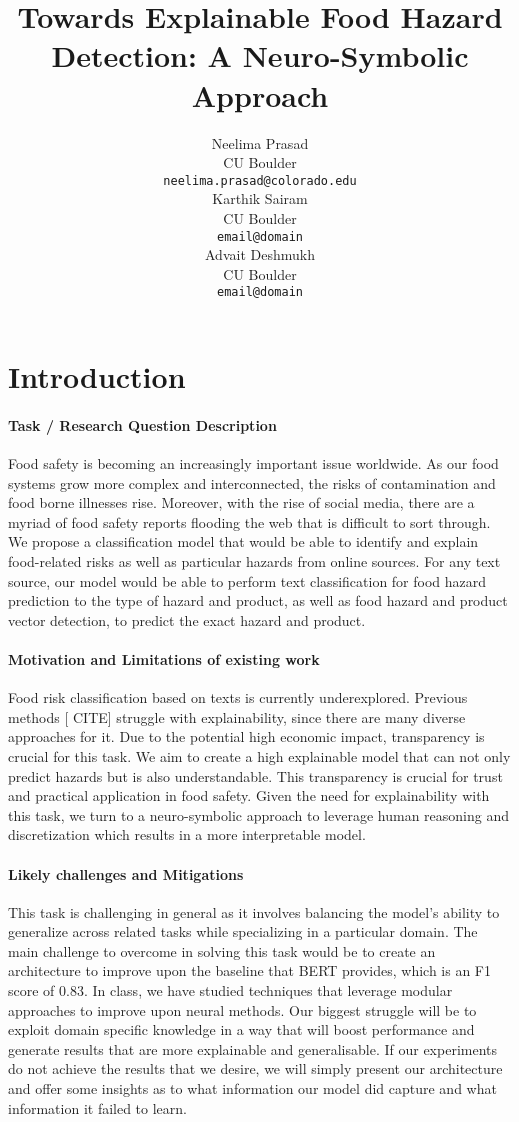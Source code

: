 \documentclass[11pt]{article}
\title{Towards Explainable Food Hazard Detection: A Neuro-Symbolic Approach}
\author{Neelima Prasad \\
  CU Boulder\\
  \texttt{neelima.prasad@colorado.edu} \\\And
  Karthik Sairam \\
  CU Boulder\\
  \texttt{email@domain} \\\And
  Advait Deshmukh \\
  CU Boulder\\
  \texttt{email@domain} \\}
\begin{document}
\maketitle


\section{Introduction}

\paragraph{Task / Research Question Description}
Food safety is becoming an increasingly important issue worldwide. As our food systems grow more complex and interconnected, the risks of contamination and food borne illnesses rise. Moreover, with the rise of social media, there are a myriad of food safety reports flooding the web that is difficult to sort through. We propose a classification model that would be able to identify and explain food-related risks as well as particular hazards from online sources. For any text source, our model would be able to perform text classification for food hazard prediction to the type of hazard and product, as well as food hazard and product vector detection, to predict the exact hazard and product.

\paragraph{Motivation and Limitations of existing work}
Food risk classification based on texts is currently underexplored. Previous methods [ CITE] struggle with explainability, since there are many diverse approaches for it. Due to the potential high economic impact, transparency is crucial for this task. We aim to create a high explainable model that can not only predict hazards but is also understandable. This transparency is crucial for trust and practical application in food safety. Given the need for explainability with this task, we turn to a neuro-symbolic approach to leverage human reasoning and discretization which results in a more interpretable model. 

\paragraph{Likely challenges and Mitigations}
This task is challenging in general as it involves balancing the model's ability to generalize across related tasks while specializing in a particular domain. The main challenge to overcome in solving this task would be to create an architecture to improve upon the baseline that BERT provides, which is an F1 score of 0.83. In class, we have studied techniques that leverage modular approaches to improve upon neural methods. Our biggest struggle will be to exploit domain specific knowledge in a way that will boost performance and generate results that are more explainable and generalisable. If our experiments do not achieve the results that we desire, we will simply present our architecture and offer some insights as to what information our model did capture and what information it failed to learn.  
\end{document}

